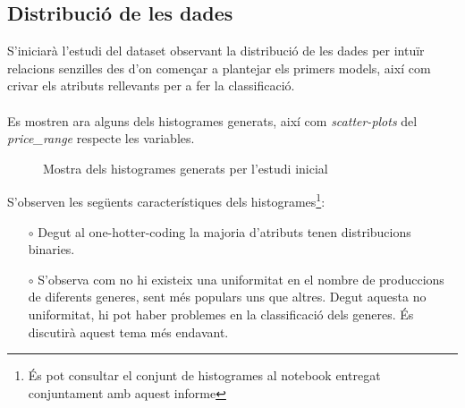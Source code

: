 \documentclass[a4paper, 11pt]{article}
\begin{document}
\subsection{Distribució de les dades}
S'iniciarà  l'estudi del dataset observant la distribució de les dades per intuïr relacions senzilles des d'on començar a plantejar els primers models, així com crivar els atributs rellevants per a fer la classificació.\\\\
Es mostren ara alguns dels histogrames generats, així com \textit{scatter-plots} del \textit{price\_range} respecte les variables. 

\begin{figure}[h]
    \centering
    \caption{Mostra dels histogrames generats per l'estudi inicial}
\end{figure}
\hspace{-1.4 em}S'observen les següents característiques dels histogrames\footnote{És pot consultar el conjunt de histogrames al notebook entregat conjuntament amb aquest informe}:
\begin{itemize}
    \item [$\circ$] Degut al one-hotter-coding la majoria d'atributs tenen distribucions binaries.
    \item [$\circ$] S'observa com no hi existeix una uniformitat en el nombre de produccions de diferents generes, sent més populars uns que altres. Degut aquesta no uniformitat, hi pot haber problemes en la classificació dels generes. És discutirà aquest tema més endavant.
\end{itemize}
\end{document}
